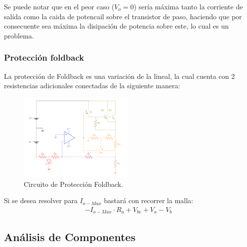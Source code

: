 Se puede notar que en el  peor caso ($V_o = 0$) sería máxima tanto la corriente de salída como la caida de potencail sobre el transistor de paso, haciendo que por consecuente sea máxima la disipación de potencia sobre este, lo cual es un problema.
\subsubsection{Protección foldback}
La protección de Foldback es una variación de la lineal, la cual cuenta con 2 resistencias adicionales conectadas de la siguiente manera:
\begin{figure}[H]
\centering
	\includegraphics[width=0.5\textwidth, page=2]{ImagenesEjercicio2/Regulador.pdf}
	\caption{Circuito de Protección Foldback.}
	\label{fig:circuitofoldback}
\end{figure}
Si se desea resolver para $I_{o-Max}$ bastará con recorrer la malla:
\begin{align}
-I_{o-Max} \cdot R_a + V_{be} + V_a-V_b
\end{align}
\subsection{Análisis de Componentes}
